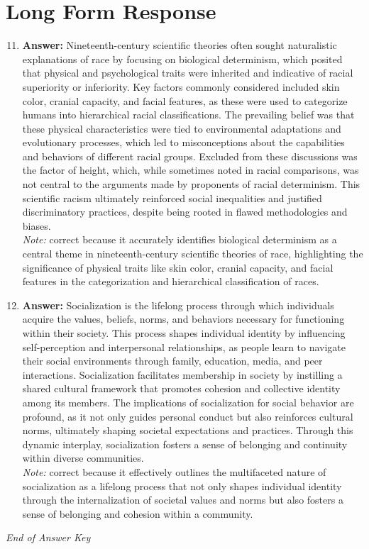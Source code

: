 \documentclass[12pt]{article}
\begin{document}
\section*{Long Form Response}
\begin{enumerate}[label=\arabic*.]
\setcounter{enumi}{10}
\item \textbf{Answer:} Nineteenth-century scientific theories often sought naturalistic explanations of race by focusing on biological determinism, which posited that physical and psychological traits were inherited and indicative of racial superiority or inferiority. Key factors commonly considered included skin color, cranial capacity, and facial features, as these were used to categorize humans into hierarchical racial classifications. The prevailing belief was that these physical characteristics were tied to environmental adaptations and evolutionary processes, which led to misconceptions about the capabilities and behaviors of different racial groups. Excluded from these discussions was the factor of height, which, while sometimes noted in racial comparisons, was not central to the arguments made by proponents of racial determinism. This scientific racism ultimately reinforced social inequalities and justified discriminatory practices, despite being rooted in flawed methodologies and biases.
\\ \textit{Note:} correct because it accurately identifies biological determinism as a central theme in nineteenth-century scientific theories of race, highlighting the significance of physical traits like skin color, cranial capacity, and facial features in the categorization and hierarchical classification of races.
\item \textbf{Answer:} Socialization is the lifelong process through which individuals acquire the values, beliefs, norms, and behaviors necessary for functioning within their society. This process shapes individual identity by influencing self-perception and interpersonal relationships, as people learn to navigate their social environments through family, education, media, and peer interactions. Socialization facilitates membership in society by instilling a shared cultural framework that promotes cohesion and collective identity among its members. The implications of socialization for social behavior are profound, as it not only guides personal conduct but also reinforces cultural norms, ultimately shaping societal expectations and practices. Through this dynamic interplay, socialization fosters a sense of belonging and continuity within diverse communities.
\\ \textit{Note:} correct because it effectively outlines the multifaceted nature of socialization as a lifelong process that not only shapes individual identity through the internalization of societal values and norms but also fosters a sense of belonging and cohesion within a community.
\end{enumerate}

\vfill
\noindent\textit{End of Answer Key}
\end{document}
